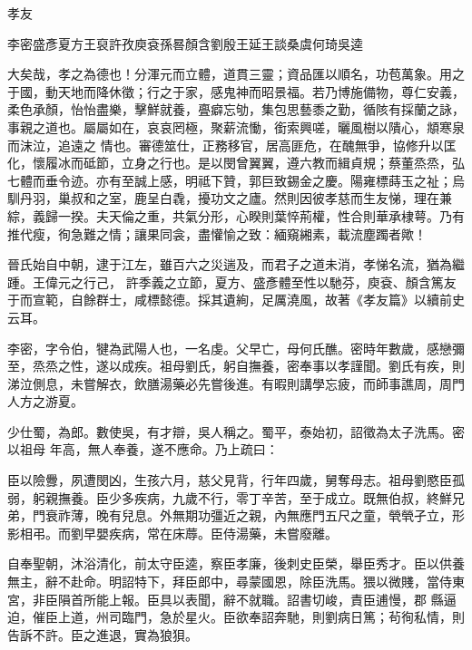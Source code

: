 
\begin{pinyinscope}

 孝友



 李密盛彥夏方王裒許孜庾袞孫晷顏含劉殷王延王談桑虞何琦吳逵



 大矣哉，孝之為德也！分渾元而立體，道貫三靈；資品匯以順名，功苞萬象。用之于國，動天地而降休徵；行之于家，感鬼神而昭景福。若乃博施備物，尊仁安義，柔色承顏，怡怡盡樂，擊鮮就養，亹癖忘劬，集包思藝黍之勤，循陔有採蘭之詠，事親之道也。屬屬如在，哀哀罔極，聚薪流慟，銜索興嗟，曬風樹以隤心，頫寒泉而沫泣，追遠之
 情也。審德筮仕，正務移官，居高匪危，在醜無爭，協修升以匡化，懷履冰而砥節，立身之行也。是以閔曾翼翼，遵六教而緝貞規；蔡董烝烝，弘七體而垂令迹。亦有至誠上感，明祗下贊，郭巨致錫金之慶。陽雍標蒔玉之祉；烏馴丹羽，巢叔和之室，鹿呈白毳，擾功文之廬。然則因彼孝慈而生友悌，理在兼綜，義歸一揆。夫天倫之重，共氣分形，心睽則葉悴荊權，性合則華承棣萼。乃有推代瘦，徇急難之情；讓果同衾，盡懽愉之致：緬窺緗素，載流塵躅者歟！



 晉氏始自中朝，逮于江左，雖百六之災遄及，而君子之道未消，孝悌名流，猶為繼踵。王偉元之行己，
 許季義之立節，夏方、盛彥體至性以馳芬，庾袞、顏含篤友于而宣範，自餘群士，咸標懿德。採其遺絢，足厲澆風，故著《孝友篇》以續前史云耳。



 李密，字令伯，犍為武陽人也，一名虔。父早亡，母何氏醮。密時年數歲，感戀彌至，烝烝之性，遂以成疾。祖母劉氏，躬自撫養，密奉事以孝謹聞。劉氏有疾，則涕泣側息，未嘗解衣，飲膳湯藥必先嘗後進。有暇則講學忘疲，而師事譙周，周門人方之游夏。



 少仕蜀，為郎。數使吳，有才辯，吳人稱之。蜀平，泰始初，詔徵為太子洗馬。密以祖母
 年高，無人奉養，遂不應命。乃上疏曰：



 臣以險釁，夙遭閔凶，生孩六月，慈父見背，行年四歲，舅奪母志。祖母劉愍臣孤弱，躬親撫養。臣少多疾病，九歲不行，零丁辛苦，至于成立。既無伯叔，終鮮兄弟，門衰祚薄，晚有兒息。外無期功彊近之親，內無應門五尺之童，煢煢孑立，形影相弔。而劉早嬰疾病，常在床蓐。臣侍湯藥，未嘗廢離。



 自奉聖朝，沐浴清化，前太守臣逵，察臣孝廉，後刺史臣榮，舉臣秀才。臣以供養無主，辭不赴命。明詔特下，拜臣郎中，尋蒙國恩，除臣洗馬。猥以微賤，當侍東宮，非臣隕首所能上報。臣具以表聞，辭不就職。詔書切峻，責臣逋慢，郡
 縣逼迫，催臣上道，州司臨門，急於星火。臣欲奉詔奔馳，則劉病日篤；茍徇私情，則告訴不許。臣之進退，實為狼狽。




\end{pinyinscope}
